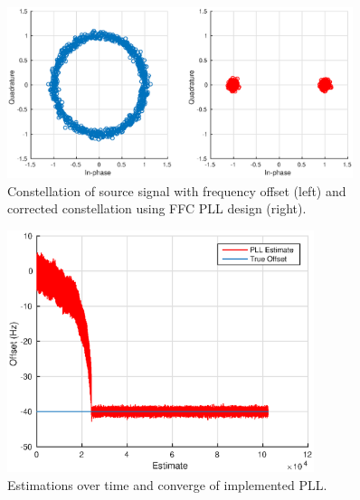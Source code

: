 \documentclass[letterpaper,12pt]{article}
\begin{document}
%
\begin{figure}[!htp]
 \centering
  \includegraphics[width=0.9\textwidth]{fixed_correction.eps}
  \caption{Constellation of source signal with frequency offset (left) and corrected 
constellation using FFC PLL design (right).}\label{fig:fine_freq_offset_constell}
\end{figure}
%
\begin{figure}[!htp]
 \centering
  \includegraphics[width=0.8\textwidth]{pll_performance.eps}
  \caption{Estimations over time and converge of implemented PLL.}\label{fig:fine_freq_offset_est}
\end{figure}
%
\end{document}

